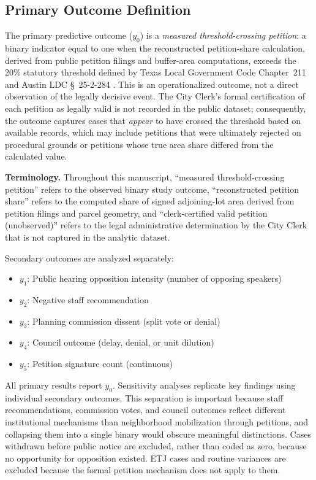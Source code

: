 \documentclass[11pt, letterpaper]{article}
\begin{document}
\subsection{Primary Outcome Definition}
\label{sec:outcome}

The primary predictive outcome ($y_0$) is a \emph{measured threshold-crossing petition}: a binary indicator equal to one when the reconstructed petition-share calculation, derived from public petition filings and buffer-area computations, exceeds the 20\% statutory threshold defined by Texas Local Government Code Chapter~211 and Austin LDC \S~25-2-284 \cite{texas211006}. This is an operationalized outcome, not a direct observation of the legally decisive event. The City Clerk's formal certification of each petition as legally valid is not recorded in the public dataset; consequently, the outcome captures cases that \emph{appear} to have crossed the threshold based on available records, which may include petitions that were ultimately rejected on procedural grounds or petitions whose true area share differed from the calculated value.

\textbf{Terminology.} Throughout this manuscript, ``measured threshold-crossing petition'' refers to the observed binary study outcome, ``reconstructed petition share'' refers to the computed share of signed adjoining-lot area derived from petition filings and parcel geometry, and ``clerk-certified valid petition (unobserved)'' refers to the legal administrative determination by the City Clerk that is not captured in the analytic dataset.

Secondary outcomes are analyzed separately:
\begin{itemize}
    \item $y_1$: Public hearing opposition intensity (number of opposing speakers)
    \item $y_2$: Negative staff recommendation
    \item $y_3$: Planning commission dissent (split vote or denial)
    \item $y_4$: Council outcome (delay, denial, or unit dilution)
    \item $y_5$: Petition signature count (continuous)
\end{itemize}

All primary results report $y_0$. Sensitivity analyses replicate key findings using individual secondary outcomes. This separation is important because staff recommendations, commission votes, and council outcomes reflect different institutional mechanisms than neighborhood mobilization through petitions, and collapsing them into a single binary would obscure meaningful distinctions. Cases withdrawn before public notice are excluded, rather than coded as zero, because no opportunity for opposition existed. ETJ cases and routine variances are excluded because the formal petition mechanism does not apply to them.
\end{document}

